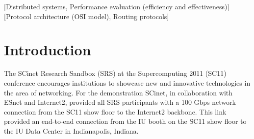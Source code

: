 \documentclass[]{sigplan-proc}
\begin{document}
\begin{abstract}

  As part of the SCinet Research Sandbox at the Supercomputing 2011 conference, Indiana University utilized a
  dedicated 100 Gbps wide area network (WAN) link spanning more than 3,500 km (2,175 mi) to demonstrate the
  capabilities of the Lustre high performance parallel file system in a high bandwidth, high latency WAN
  environment. This demonstration functioned as a proof of concept and provided an opportunity to study
  Lustre's performance over a 100 Gbps WAN. To characterize the performance of the network and file system a
  series of benchmarks and tests were undertaken. These included low level iperf network tests, Lustre
  networking (LNET) tests, file system tests with the IOR benchmark, and a suite of real-world applications reading
  and writing to the file system. All of the tests and benchmarks were run over a the WAN link with a latency
  of 50.5 ms. In this article we describe the configuration and constraints of the demonstration and focus in
  on the key findings and discoveries made regarding the Lustre networking layer for this extremely high
  bandwidth and high latency connection. Of particular interest is the relationship between the {\tt peer\_credits}
  and {\tt max\_rpcs\_in\_flight} settings when considering LNET performance.

\end{abstract}

[Distributed systems, Performance evaluation (efficiency and effectiveness)]
[Protocol architecture (OSI model),
Routing protocols]



\section{Introduction}\label{sec:intro}

The SCinet Research Sandbox (SRS) at the Supercomputing 2011 (SC11) conference encourages institutions to
showcase new and innovative technologies in the area of networking. For the demonstration SCinet, in
collaboration with ESnet and Internet2, provided all SRS participants with a 100 Gbps network connection from
the SC11 show floor to the Internet2 backbone. This link provided an end-to-end connection from the IU booth
on the SC11 show floor to the IU Data Center in Indianapolis, Indiana. 
\end{document}
